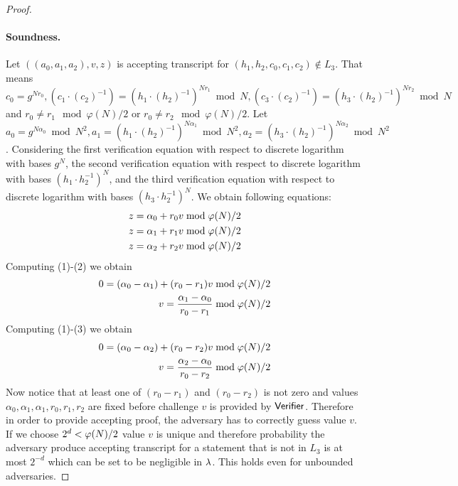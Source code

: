 \begin{proof}
\paragraph{Soundness.} Let $((a_0, a_1, a_2), v, z)$ is accepting transcript for $(h_1, h_2, c_0, c_1, c_2) \notin L_3$. That means $c_0 = g^{Nr_0}, (c_1\cdot (c_2)^{-1}) = (h_1\cdot (h_2)^{-1})^{Nr_1} \bmod N, (c_3\cdot (c_2)^{-1}) = (h_3\cdot (h_2)^{-1})^{Nr_2} \bmod N$ and $r_0 \neq r_1 \mod \varphi(N)/2$ or $r_0 \neq r_2 \mod \varphi(N)/2$. Let $a_0 = g^{N\alpha_0} \bmod N^2, a_1 = (h_1\cdot (h_2)^{-1})^{N\alpha_1} \bmod N^2, a_2 = (h_3\cdot (h_2)^{-1})^{N\alpha_2} \bmod N^2$. Considering the first verification equation with respect to discrete logarithm with bases $g^N$, the second verification equation with respect to discrete logarithm with bases $(h_1 \cdot h_2^{-1})^N$, and the third verification equation with respect to discrete logarithm with bases $(h_3 \cdot h_2^{-1})^N$.  We obtain following equations:
\begin{align}
z = \alpha_0 + r_0 v \bmod \varphi(N)/2\\
z = \alpha_1 + r_1 v \bmod \varphi(N)/2 \\
z = \alpha_2 + r_2 v \bmod \varphi(N)/2
\end{align}
Computing (1)-(2) we obtain
\begin{align*}
0 = (\alpha_0 - \alpha_1)+ (r_0-r_1)v \bmod \varphi(N)/2 \\
v = \frac{\alpha_1 - \alpha_0}{r_0-r_1} \bmod \varphi(N)/2
\end{align*}
Computing (1)-(3) we obtain
\begin{align*}
0 = (\alpha_0 - \alpha_2)+ (r_0-r_2)v \bmod \varphi(N)/2 \\
v = \frac{\alpha_2 - \alpha_0}{r_0-r_2} \bmod \varphi(N)/2
\end{align*}
Now notice that at least one of $(r_0 - r_1)$ and $(r_0 - r_2)$ is not zero and values $\alpha_0, \alpha_1, \alpha_1, r_0, r_1, r_2$ are fixed before challenge $v$ is provided by $\mathsf{Verifier}$. Therefore in order to provide accepting proof, the adversary has to correctly guess value $v$. If we choose $2^d < \varphi(N)/2$ value $v$ is unique and therefore probability the adversary produce accepting transcript for a statement that is not in $L_3$ is at most $2^{-d}$ which can be set to be negligible in $\lambda$. This holds even for unbounded adversaries. 




\end{proof}
